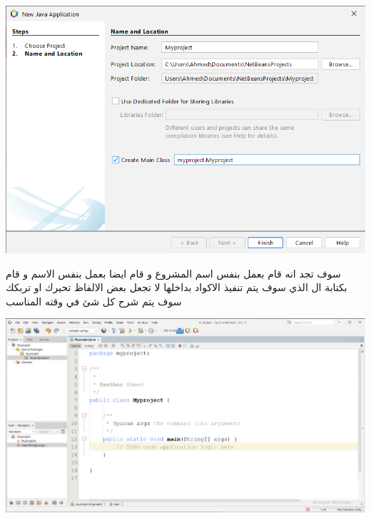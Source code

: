   \begin{center}
    \includegraphics[scale=.4]{naming the project.png}  
  \end{center}
  
  \begin{AR}
    سوف تجد انه قام بعمل  بنفس اسم المشروع و قام ايضا بعمل  بنفس الاسم و قام بكتابة ال  الذي سوف يتم تنفيذ الاكواد بداخلها
    لا تجعل بعض الالفاظ تحيرك او تربكك سوف يتم شرح كل شئ في وقته المناسب 
  \end{AR}
  \begin{center}
    \includegraphics[scale=.35]{homepage.png}  
  \end{center}
  
